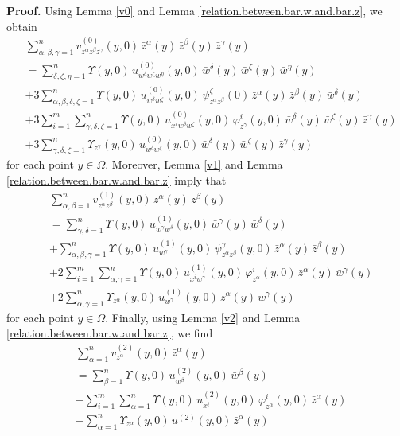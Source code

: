 \documentclass[11pt]{amsart}
\theoremstyle{definition}
\begin{document}
\textbf{Proof.} 
Using Lemma \ref{v0} and Lemma \ref{relation.between.bar.w.and.bar.z}, we obtain 
\begin{align*}
&\sum_{\alpha,\beta,\gamma=1}^n v^{(0)}_{z^\alpha z^\beta z^\gamma}(y,0) \, \bar{z}^\alpha(y) \, \bar{z}^\beta(y) \, \bar{z}^\gamma(y) \\ 
&= \sum_{\delta,\zeta,\eta=1}^n \Upsilon(y,0) \, u^{(0)}_{w^\delta w^\zeta w^\eta}(y,0) \, \bar{w}^\delta(y) \, \bar{w}^\zeta(y) \, \bar{w}^\eta(y) \\ 
&+ 3 \sum_{\alpha,\beta,\delta,\zeta=1}^n \Upsilon(y,0) \, u^{(0)}_{w^\delta w^\zeta}(y,0) \, \psi^\zeta_{z^\alpha z^\beta}(0) \, \bar{z}^\alpha(y) \, \bar{z}^\beta(y) \, \bar{w}^\delta(y) \\ 
&+ 3 \sum_{i=1}^m \sum_{\gamma,\delta,\zeta=1}^n \Upsilon(y,0) \, u^{(0)}_{x^i w^\delta w^\zeta}(y,0) \, \varphi^i_{z^\gamma}(y,0) \, \bar{w}^\delta(y) \, \bar{w}^\zeta(y) \, \bar{z}^\gamma(y) \\ 
&+ 3 \sum_{\gamma,\delta,\zeta=1}^n \Upsilon_{z^\gamma}(y,0) \, u^{(0)}_{w^\delta w^\zeta}(y,0) \, \bar{w}^\delta(y) \, \bar{w}^\zeta(y) \, \bar{z}^\gamma(y) 
\end{align*} 
for each point $y \in \Omega$. Moreover, Lemma \ref{v1} and Lemma \ref{relation.between.bar.w.and.bar.z} imply that  
\begin{align*} 
&\sum_{\alpha,\beta=1}^n v^{(1)}_{z^\alpha z^\beta}(y,0) \, \bar{z}^\alpha(y) \, \bar{z}^\beta(y) \\ 
&= \sum_{\gamma,\delta=1}^n \Upsilon(y,0) \, u^{(1)}_{w^\gamma w^\delta}(y,0) \, \bar{w}^\gamma(y) \, \bar{w}^\delta(y) \\ 
&+ \sum_{\alpha,\beta,\gamma=1}^n \Upsilon(y,0) \, u^{(1)}_{w^\gamma}(y,0) \, \psi^\gamma_{z^\alpha z^\beta}(y,0) \, \bar{z}^\alpha(y) \, \bar{z}^\beta(y) \\
&+ 2 \sum_{i=1}^m \sum_{\alpha,\gamma=1}^n \Upsilon(y,0) \, u^{(1)}_{x^i w^\gamma}(y,0) \, \varphi^i_{z^\alpha}(y,0) \, \bar{z}^\alpha(y) \, \bar{w}^\gamma(y) \\ 
&+ 2 \sum_{\alpha,\gamma=1}^n \Upsilon_{z^\alpha}(y,0) \, u^{(1)}_{w^\gamma}(y,0) \, \bar{z}^\alpha(y) \, \bar{w}^\gamma(y) 
\end{align*}
for each point $y \in \Omega$. Finally, using Lemma \ref{v2} and Lemma \ref{relation.between.bar.w.and.bar.z}, we find 
\begin{align*} 
&\sum_{\alpha=1}^n v^{(2)}_{z^\alpha}(y,0) \, \bar{z}^\alpha(y) \\ 
&= \sum_{\beta=1}^n \Upsilon(y,0) \, u^{(2)}_{w^\beta}(y,0) \, \bar{w}^\beta(y) \\ 
&+ \sum_{i=1}^m \sum_{\alpha=1}^n \Upsilon(y,0) \, u^{(2)}_{x^i}(y,0) \, \varphi^i_{z^\alpha}(y,0) \, \bar{z}^\alpha(y) \\ 
&+ \sum_{\alpha=1}^n \Upsilon_{z^\alpha}(y,0) \, u^{(2)}(y,0)  \, \bar{z}^\alpha(y) 
\end{align*}
\end{document}
